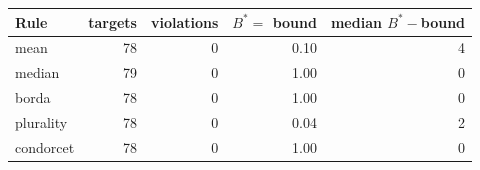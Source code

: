 \begin{tabular}{@{}lrrrr@{}}\toprule
Rule & targets & violations & $B^\ast=$ bound & median $B^\ast-$bound\\\midrule
mean & 78 & 0 & 0.10 & 4\\
median & 79 & 0 & 1.00 & 0\\
borda & 78 & 0 & 1.00 & 0\\
plurality & 78 & 0 & 0.04 & 2\\
condorcet & 78 & 0 & 1.00 & 0\\
\bottomrule\end{tabular}
